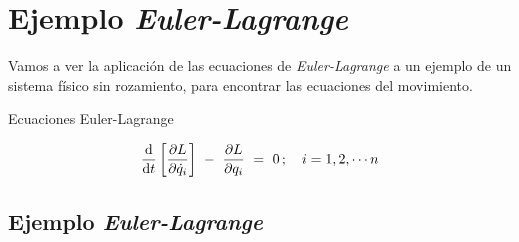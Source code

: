 \chapter{Ejemplo \emph{Euler-Lagrange}}
\label{capejemEE}

\vspace{1cm}

\begin{adjustwidth}{50pt}{50pt}
\begin{ejemplo}
	Vamos a ver la aplicación de las ecuaciones de \emph{Euler-Lagrange} a  un ejemplo de un sistema físico sin rozamiento, para encontrar las ecuaciones del movimiento.
\end{ejemplo}
\end{adjustwidth}

\vspace{0.5cm}

\begin{myblock}{Ecuaciones Euler-Lagrange}
\begin{large}
	\begin{equation}
	\dv{t} \left[ \pdv{ L }{\dot q_i} \right] \ - \ \pdv{L}{q_i} \ = \ 0	\, ; \quad i=1,2,\cdots n
	\end{equation}
\end{large}
\end{myblock}

\vspace{0.5cm}

\section{Ejemplo \emph{Euler-Lagrange}}
\label{T3ejem}



